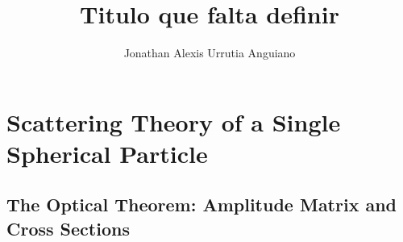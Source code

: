 \documentclass[11pt]{Latex/Classes/PhDthesisPSnPDF}
\author{Jonathan Alexis Urrutia Anguiano}
\title{Titulo que falta definir}
\begin{document}
%
\maketitle


%
%
%
%

%
\setcounter{secnumdepth}{3} %
\setcounter{tocdepth}{3}    %
 
\tableofcontents            %


\mainmatter

\def\baselinestretch{1}                   %



\chapter{Scattering Theory of a Single Spherical Particle}
  \label{ch:OpticalProperties}

	\section{The Optical Theorem: Amplitude Matrix and Cross Sections}
	 \label{s:AmpMatCrossSect}
	 
\end{document}

